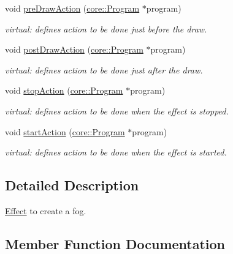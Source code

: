 \begin{DoxyCompactItemize}
\item 
void \hyperlink{classfillwave_1_1effects_1_1Fog_a943f060680f000663eba8b2c93398ee8}{pre\+Draw\+Action} (\hyperlink{classfillwave_1_1core_1_1Program}{core\+::\+Program} $\ast$program)
\begin{DoxyCompactList}\small\item\em virtual\+: defines action to be done just before the draw. \end{DoxyCompactList}\item 
void \hyperlink{classfillwave_1_1effects_1_1Fog_a2a625835d139fb614a5325acba7604fc}{post\+Draw\+Action} (\hyperlink{classfillwave_1_1core_1_1Program}{core\+::\+Program} $\ast$program)
\begin{DoxyCompactList}\small\item\em virtual\+: defines action to be done just after the draw. \end{DoxyCompactList}\item 
void \hyperlink{classfillwave_1_1effects_1_1Fog_a2b5eb2628c9db559446619db744ebed5}{stop\+Action} (\hyperlink{classfillwave_1_1core_1_1Program}{core\+::\+Program} $\ast$program)
\begin{DoxyCompactList}\small\item\em virtual\+: defines action to be done when the effect is stopped. \end{DoxyCompactList}\item 
void \hyperlink{classfillwave_1_1effects_1_1Fog_a8a7c4a0fb2f5cb95873d2b827354a4f8}{start\+Action} (\hyperlink{classfillwave_1_1core_1_1Program}{core\+::\+Program} $\ast$program)
\begin{DoxyCompactList}\small\item\em virtual\+: defines action to be done when the effect is started. \end{DoxyCompactList}\end{DoxyCompactItemize}


\subsection{Detailed Description}
\hyperlink{classfillwave_1_1effects_1_1Effect}{Effect} to create a fog. 

\subsection{Member Function Documentation}
\hypertarget{classfillwave_1_1effects_1_1Fog_a2a625835d139fb614a5325acba7604fc}{}
